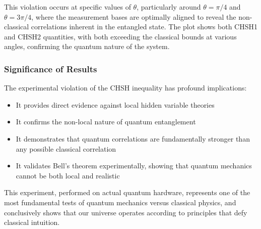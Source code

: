 \documentclass[12pt,a4paper]{article}
\begin{document}
This violation occurs at specific values of $\theta$, particularly around $\theta = \pi/4$ and $\theta = 3\pi/4$, where the measurement bases are optimally aligned to reveal the non-classical correlations inherent in the entangled state. The plot shows both CHSH1 and CHSH2 quantities, with both exceeding the classical bounds at various angles, confirming the quantum nature of the system.

\subsubsection{Significance of Results}

The experimental violation of the CHSH inequality has profound implications:

\begin{itemize}
    \item It provides direct evidence against local hidden variable theories
    \item It confirms the non-local nature of quantum entanglement
    \item It demonstrates that quantum correlations are fundamentally stronger than any possible classical correlation
    \item It validates Bell's theorem experimentally, showing that quantum mechanics cannot be both local and realistic
\end{itemize}

This experiment, performed on actual quantum hardware, represents one of the most fundamental tests of quantum mechanics versus classical physics, and conclusively shows that our universe operates according to principles that defy classical intuition.
\end{document}
